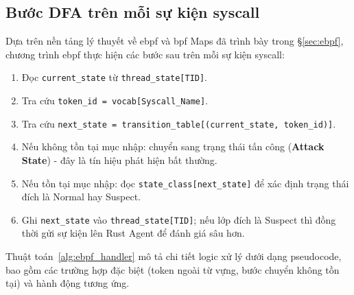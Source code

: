 \documentclass[../main.tex]{subfiles}
\begin{document}
\subsection{Bước DFA trên mỗi sự kiện syscall}
\label{sec:dfa_step}

Dựa trên nền tảng lý thuyết về \gls{ebpf} và \gls{bpf} Maps đã trình bày trong
§\ref{sec:ebpf},
chương trình \gls{ebpf} thực hiện các bước sau trên mỗi sự kiện \gls{syscall}:

\begin{enumerate}
  \item Đọc \texttt{current\_state} từ \texttt{thread\_state[TID]}.
  \item Tra cứu \texttt{token\_id = vocab[Syscall\_Name]}.
  \item Tra cứu \texttt{next\_state =
    transition\_table[(current\_state, token\_id)]}.
  \item Nếu không tồn tại mục nhập: chuyển sang trạng thái tấn công
    (\textbf{Attack State}) - đây là tín hiệu phát hiện bất thường.
  \item Nếu tồn tại mục nhập: đọc \texttt{state\_class[next\_state]} để xác định
    trạng thái đích là Normal hay Suspect.
  \item Ghi \texttt{next\_state} vào \texttt{thread\_state[TID]}; nếu
    lớp đích là
    Suspect thì đồng thời gửi sự kiện lên Rust Agent để đánh giá sâu hơn.
\end{enumerate}

Thuật toán~\ref{alg:ebpf_handler} mô tả chi tiết logic xử lý dưới
dạng pseudocode,
bao gồm các trường hợp đặc biệt (token ngoài từ vựng, bước chuyển
không tồn tại) và
hành động tương ứng.
\end{document}
